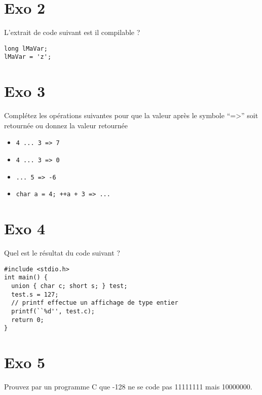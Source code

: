 \documentclass[10pt,twocolumn]{article}
\begin{document}
\section{Exo 2}
L'extrait de code suivant est il compilable ?
\begin{verbatim}
long lMaVar; 
lMaVar = 'z';
\end{verbatim}

\section{Exo 3}
Compl\'etez les op\'erations suivantes pour que la valeur apr\`es le symbole ``=>'' soit retourn\'ee ou donnez la valeur retourn\'ee
\begin{itemize}
\item \verb|4 ... 3 => 7|
\item \verb|4 ... 3 => 0|
\item \verb|... 5 => -6| 
\item \verb|char a = 4; ++a + 3 => ...|
\end{itemize}

\section{Exo 4}
Quel est le r\'esultat du code suivant ?
\begin{verbatim}
#include <stdio.h>
int main() {
  union { char c; short s; } test; 
  test.s = 127; 
  // printf effectue un affichage de type entier
  printf(``%d'', test.c); 
  return 0; 
}
\end{verbatim}

\section{Exo 5}
Prouvez par un programme C que -128 ne se code pas 11111111 mais 10000000.
\end{document}
